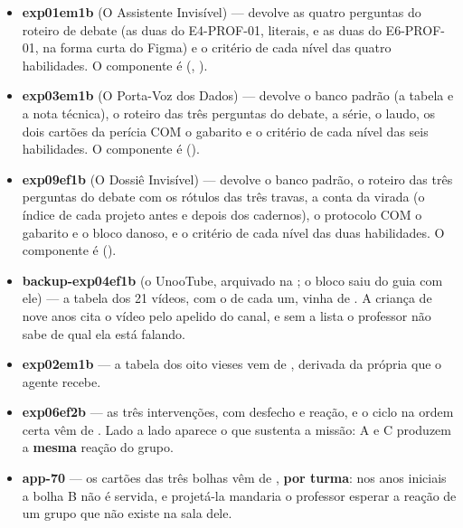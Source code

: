 \begin{itemize}
    curriculares do 2º ano, as cartas dos pares com a atividade e a cor, e os
    critérios das duas habilidades. O
    componente é , que desenha a cena com
    o mesmo  do painel ().
  \item \textbf{exp01em1b} (O Assistente Invisível) ---
     devolve as quatro
    perguntas do roteiro de debate (as duas do E4-PROF-01, literais, e as duas
    do E6-PROF-01, na forma curta do Figma) e o critério de cada nível das
    quatro habilidades. O componente é
     (,
    ).
  \item \textbf{exp03em1b} (O Porta-Voz dos Dados) ---
     devolve o banco
    padrão (a tabela e a nota técnica), o roteiro das três perguntas do
    debate, a série, o laudo, os dois cartões da perícia COM o gabarito e o
    critério de cada nível das seis habilidades. O componente é
     ().
  \item \textbf{exp09ef1b} (O Dossiê Invisível) ---
     devolve o banco
    padrão, o roteiro das três perguntas do debate com os rótulos das três
    travas, a conta da virada (o índice de cada projeto antes e depois dos
    cadernos), o protocolo COM o gabarito e o bloco danoso, e o critério de
    cada nível das duas habilidades. O componente é
     ().
  \item \textbf{backup-exp04ef1b} (o UnooTube, arquivado na ; o
    bloco saiu do guia com ele) --- a tabela dos 21 vídeos, com o  de
    cada um, vinha de . A criança de nove
    anos cita o vídeo pelo apelido do canal, e sem a lista o professor não sabe
    de qual ela está falando.
  \item \textbf{exp02em1b} --- a tabela dos oito vieses vem de
    , derivada da própria  que
    o agente recebe.
  \item \textbf{exp06ef2b} --- as três intervenções, com desfecho e reação, e o
    ciclo na ordem certa vêm de .
    Lado a lado aparece o que sustenta a missão: A e C produzem a
    \textbf{mesma} reação do grupo.
  \item \textbf{app-70} --- os cartões das três bolhas vêm de
    , \textbf{por turma}: nos anos iniciais a
    bolha B não é servida, e projetá-la mandaria o professor esperar a reação de
    um grupo que não existe na sala dele.
\end{itemize}

